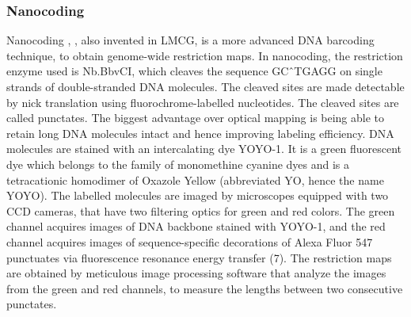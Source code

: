 \subsubsection*{Nanocoding}
Nanocoding \cite{Jo_etal_2007_PNAS}, \cite{Jo_etal_2009}, also invented in LMCG, is a more advanced DNA barcoding technique, to obtain genome-wide restriction maps. In nanocoding, the restriction enzyme used is Nb.BbvCI, which cleaves the sequence GC\^\ TGAGG on single strands of double-stranded DNA molecules. The cleaved sites are made detectable by nick translation using fluorochrome-labelled nucleotides. The cleaved sites are called punctates. The biggest advantage over optical mapping is being able to retain long DNA molecules intact and hence improving labeling efficiency. DNA molecules are stained with an intercalating dye YOYO-1. It is a green fluorescent dye which belongs to the family of monomethine cyanine dyes and is a tetracationic homodimer of Oxazole Yellow (abbreviated YO, hence the name YOYO). The labelled molecules are imaged by microscopes equipped with two CCD cameras, that have two filtering optics for green and red colors. The green channel acquires images of DNA backbone stained with YOYO-1, and the red channel acquires images of sequence-specific decorations of Alexa Fluor 547 punctuates via fluorescence resonance energy transfer (7). The restriction maps are obtained by meticulous image processing software that analyze the images from the green and red channels, to measure the lengths between two consecutive punctates.  \\

